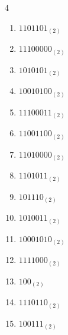 \begin{multicols}{4}
\begin{enumerate}
        \phantom{$=33$}

  \item $1101101_{(2)}$

        \phantom{$=109$}

\columnbreak %

  \item $11100000_{(2)}$

        \phantom{$=224$}

  \item $1010101_{(2)}$

        \phantom{$=85$}

  \item $10010100_{(2)}$

        \phantom{$=148$}

  \item $11100011_{(2)}$

        \phantom{$=227$}

  \item $11001100_{(2)}$

        \phantom{$=204$}

  \item $11010000_{(2)}$

        \phantom{$=208$}

  \item $1101011_{(2)}$

        \phantom{$=107$}

  \item $101110_{(2)}$

        \phantom{$=46$}

  \item $1010011_{(2)}$

        \phantom{$=83$}

  \item $10001010_{(2)}$

        \phantom{$=138$}

  \item $1111000_{(2)}$

        \phantom{$=120$}

  \item $100_{(2)}$

        \phantom{$=4$}

  \item $1110110_{(2)}$

        \phantom{$=118$}

  \item $100111_{(2)}$


\end{enumerate}
\end{multicols}
